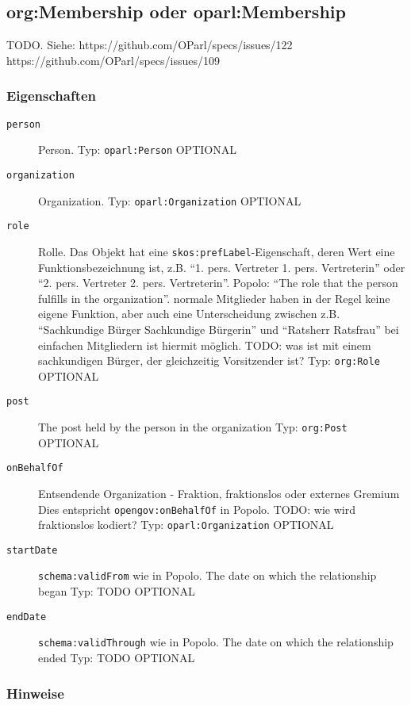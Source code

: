 \documentclass[,a4paper]{article}
\begin{document}
\subsection{org:Membership oder
oparl:Membership}\label{oparlux5fmembership}

TODO. Siehe: https://github.com/OParl/specs/issues/122
https://github.com/OParl/specs/issues/109

\subsubsection{Eigenschaften}\label{eigenschaften-10}

\begin{description}
\item[\texttt{person}]
Person. Typ: \texttt{oparl:Person} OPTIONAL
\item[\texttt{organization}]
Organization. Typ: \texttt{oparl:Organization} OPTIONAL
\item[\texttt{role}]
Rolle. Das Objekt hat eine \texttt{skos:prefLabel}-Eigenschaft, deren
Wert eine Funktionsbezeichnung ist, z.B. ``1. pers. Vertreter \textbar{}
1. pers. Vertreterin'' oder ``2. pers. Vertreter \textbar{} 2. pers.
Vertreterin''. Popolo: ``The role that the person fulfills in the
organization''. normale Mitglieder haben in der Regel keine eigene
Funktion, aber auch eine Unterscheidung zwischen z.B. ``Sachkundige
Bürger \textbar{} Sachkundige Bürgerin'' und ``Ratsherr \textbar{}
Ratsfrau'' bei einfachen Mitgliedern ist hiermit möglich. TODO: was ist
mit einem sachkundigen Bürger, der gleichzeitig Vorsitzender ist? Typ:
\texttt{org:Role} OPTIONAL
\item[\texttt{post}]
The post held by the person in the organization Typ: \texttt{org:Post}
OPTIONAL
\item[\texttt{onBehalfOf}]
Entsendende Organization - Fraktion, fraktionslos oder externes Gremium
Dies entspricht \texttt{opengov:onBehalfOf} in Popolo. TODO: wie wird
fraktionslos kodiert? Typ: \texttt{oparl:Organization} OPTIONAL
\item[\texttt{startDate}]
\texttt{schema:validFrom} wie in Popolo. The date on which the
relationship began Typ: TODO OPTIONAL
\item[\texttt{endDate}]
\texttt{schema:validThrough} wie in Popolo. The date on which the
relationship ended Typ: TODO OPTIONAL
\end{description}

\subsubsection{Hinweise}\label{hinweise}
\end{document}
